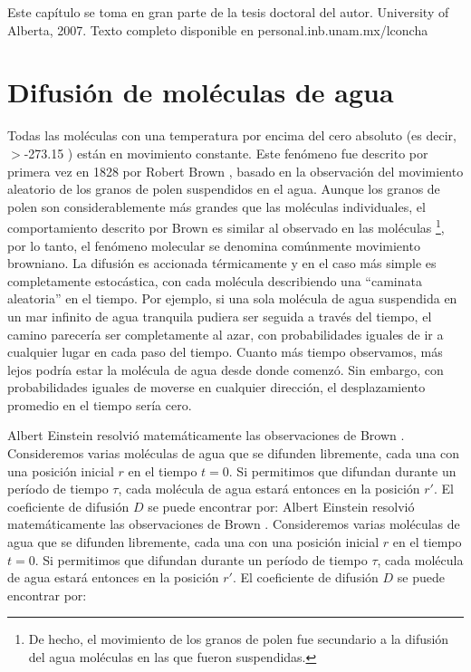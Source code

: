 
Este capítulo se toma en gran parte de la tesis doctoral del autor. University of Alberta, 2007. Texto completo disponible en personal.inb.unam.mx/lconcha

\section{Difusión de moléculas de agua}

Todas las moléculas con una temperatura por encima del cero absoluto (es decir, $>$-273.15 \degrees) están en movimiento constante. Este fenómeno fue descrito por primera vez en 1828 por Robert Brown \cite{Brown1828}, basado en la observación del movimiento aleatorio de los granos de polen suspendidos en el agua. Aunque los granos de polen son considerablemente más grandes que las moléculas individuales, el comportamiento descrito por Brown es similar al observado en las moléculas \footnote{De hecho, el movimiento de los granos de polen fue secundario a la difusión del agua moléculas en las que fueron suspendidas.}, por lo tanto, el fenómeno molecular se denomina comúnmente movimiento browniano. La difusión es accionada térmicamente y en el caso más simple es completamente estocástica, con cada molécula describiendo una ``caminata aleatoria'' en el tiempo. Por ejemplo, si una sola molécula de agua suspendida en un mar infinito de agua tranquila pudiera ser seguida a través del tiempo, el camino parecería ser completamente al azar, con probabilidades iguales de ir a cualquier lugar en cada paso del tiempo. Cuanto más tiempo observamos, más lejos podría estar la molécula de agua desde donde comenzó. Sin embargo, con probabilidades iguales de moverse en cualquier dirección, el desplazamiento promedio en el tiempo sería cero.

Albert Einstein resolvió matemáticamente las observaciones de Brown \cite{Einstein1905}. Consideremos varias moléculas de agua que se difunden libremente, cada una con una posición inicial $r$ en el tiempo {$t = 0$}. Si permitimos que  difundan durante un período de tiempo \(\tau\), cada molécula de agua estará entonces en la posición {$r'$}. El coeficiente de difusión {$D$} se puede encontrar por:
Albert Einstein resolvió matemáticamente las observaciones de Brown \cite{Einstein1905}. Consideremos varias moléculas de agua que se difunden libremente, cada una con una posición inicial $r$ en el tiempo {$t = 0$}. Si permitimos que  difundan durante un período de tiempo \(\tau\), cada molécula de agua estará entonces en la posición {$r'$}. El coeficiente de difusión {$D$} se puede encontrar por:

